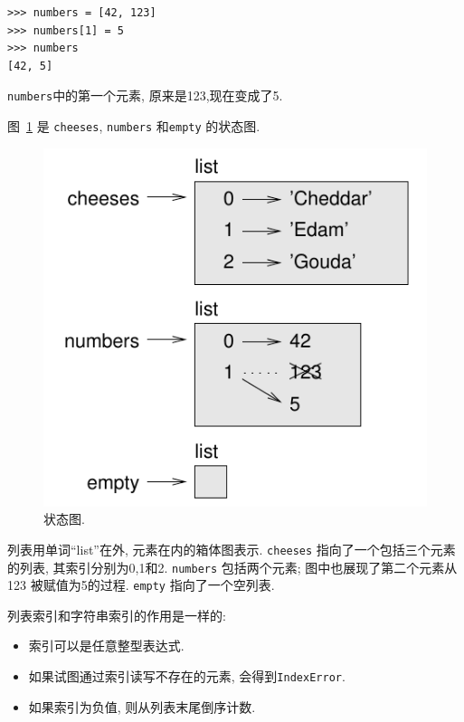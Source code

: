 \documentclass[10pt]{book}
\begin{document}
\begin{verbatim}
>>> numbers = [42, 123]
>>> numbers[1] = 5
>>> numbers
[42, 5]
\end{verbatim}
%
{\tt numbers}中的第一个元素, 原来是123,现在变成了5.


图~\ref{fig.liststate} 是 {\tt cheeses}, {\tt numbers} 和{\tt empty} 的状态图.

\begin{figure}
\centerline
{\includegraphics[scale=0.8]{figs/liststate.pdf}}
\caption{状态图.}
\label{fig.liststate}
\end{figure}

列表用单词``list''在外, 元素在内的箱体图表示. 
{\tt cheeses} 指向了一个包括三个元素的列表, 其索引分别为0,1和2. 
{\tt numbers} 包括两个元素; 图中也展现了第二个元素从123 被赋值为5的过程. 
{\tt empty} 指向了一个空列表. 

列表索引和字符串索引的作用是一样的:

\begin{itemize}

\item 索引可以是任意整型表达式.

\item 如果试图通过索引读写不存在的元素, 会得到{\tt IndexError}.

\item 如果索引为负值, 则从列表末尾倒序计数. 

\end{itemize}
\end{document}
